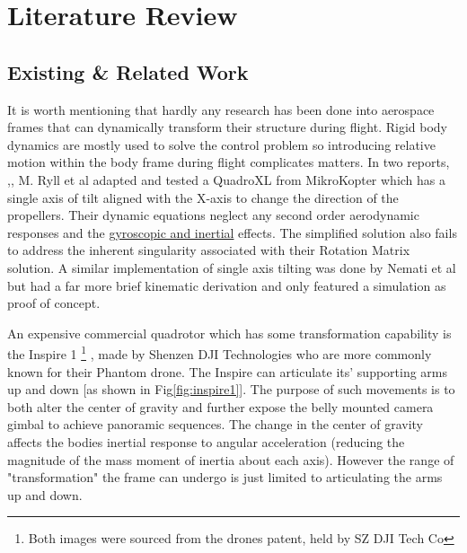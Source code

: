 \section{Literature Review}
\label{sec:intro.litreview}
\subsection{Existing \& Related Work}
\label{subsec:intro.lit.related}
It is worth mentioning that  hardly any research has been done into aerospace frames that can dynamically transform their structure during flight. Rigid body dynamics are mostly used to solve the control problem so introducing relative motion within the body frame during flight complicates matters. In two reports, \cite{tiltpropellercontrol},\cite{tiltpropellerflight}, M. Ryll et al adapted and tested a QuadroXL from MikroKopter \cite{mikrokopter} which has a single axis of tilt aligned with the X-axis to change the direction of the propellers. Their dynamic equations neglect any second order aerodynamic responses and the \underline{gyroscopic and inertial} effects. The simplified solution also fails to address the inherent singularity associated with their Rotation Matrix solution. A similar implementation of single axis tilting was done by Nemati et al \cite{singleaxistilting} but had a far more brief kinematic derivation and only featured a simulation as proof of concept.
\par
An expensive commercial quadrotor which has some transformation capability is the Inspire 1 \cite{inspire}\footnote{Both images were sourced from the drones patent, held by SZ DJI Tech Co\cite{djinspire}}
, made by Shenzen DJI Technologies who are more commonly known for their Phantom drone. The Inspire can articulate its' supporting arms up and down [as shown in Fig\ref{fig:inspire1}]. The purpose of such movements is to both alter the center of gravity and further expose the belly mounted camera gimbal to achieve panoramic sequences. The change in the center of gravity affects the bodies inertial response to angular acceleration (reducing the magnitude of the mass moment of inertia about each axis). However the range of "transformation" the frame can undergo is just limited to articulating the arms up and down.
